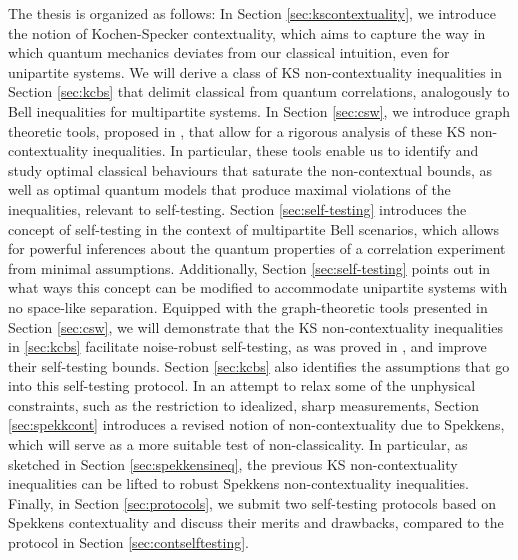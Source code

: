 The thesis is organized as follows:
In Section \ref{sec:kscontextuality}, we introduce the notion of Kochen-Specker contextuality, which aims to capture the way in which quantum mechanics deviates from our classical intuition, even for unipartite systems. We will derive a class of KS non-contextuality inequalities in Section \ref{sec:kcbs} that delimit classical from quantum correlations, analogously to Bell inequalities for multipartite systems. In Section \ref{sec:csw}, we introduce graph theoretic tools, proposed in \cite{Cabello2014}, that allow for a rigorous analysis of these KS non-contextuality inequalities. In particular, these tools enable us to identify and study optimal classical behaviours that saturate the non-contextual bounds, as well as optimal quantum models that produce maximal violations of the inequalities, relevant to self-testing. Section \ref{sec:self-testing} introduces the concept of self-testing in the context of multipartite Bell scenarios, which allows for powerful inferences about the quantum properties of a correlation experiment from minimal assumptions. Additionally, Section \ref{sec:self-testing} points out in what ways this concept can be modified to accommodate unipartite systems with no space-like separation. Equipped with the graph-theoretic tools presented in Section \ref{sec:csw}, we will demonstrate that the KS non-contextuality inequalities in \ref{sec:kcbs} facilitate noise-robust self-testing, as was proved in \cite{Bharti2019}, and improve their self-testing bounds. Section \ref{sec:kcbs} also identifies the assumptions that go into this self-testing protocol. In an attempt to relax some of the unphysical constraints, such as the restriction to idealized, sharp measurements, Section \ref{sec:spekkcont} introduces a revised notion of non-contextuality due to Spekkens, which will serve as a more suitable test of non-classicality. In particular, as sketched in Section \ref{sec:spekkensineq}, the previous KS non-contextuality inequalities can be lifted to robust Spekkens non-contextuality inequalities. Finally, in Section \ref{sec:protocols}, we submit two self-testing protocols based on Spekkens contextuality and discuss their merits and drawbacks, compared to the protocol in Section \ref{sec:contselftesting}.